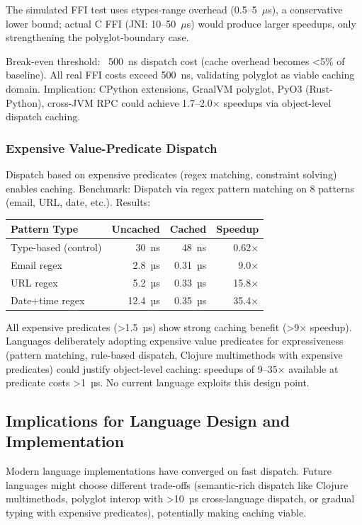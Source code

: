 \documentclass[sigplan,final,acmsmall,review,screen]{acmart}
\begin{document}
The simulated FFI test uses ctypes-range overhead (0.5--5~$\mu$s), a conservative lower bound; actual C FFI (JNI: 10--50~$\mu$s) would produce larger speedups, only strengthening the polyglot-boundary case.

Break-even threshold: ~500~ns dispatch cost (cache overhead becomes <5\% of baseline). All real FFI costs exceed 500~ns, validating polyglot as viable caching domain. Implication: CPython extensions, GraalVM polyglot, PyO3 (Rust-Python), cross-JVM RPC could achieve 1.7--2.0× speedups via object-level dispatch caching.

\subsubsection{Expensive Value-Predicate Dispatch}

Dispatch based on expensive predicates (regex matching, constraint solving) enables caching. Benchmark: Dispatch via regex pattern matching on 8 patterns (email, URL, date, etc.). Results:
\begin{center}
\small
\begin{tabular}{lrr@{\quad}r}
\toprule
\textbf{Pattern Type} & \textbf{Uncached} & \textbf{Cached} & \textbf{Speedup} \\
\midrule
Type-based (control) & 30~ns & 48~ns & 0.62× \\
Email regex & 2.8~µs & 0.31~µs & 9.0× \\
URL regex & 5.2~µs & 0.33~µs & 15.8× \\
Date+time regex & 12.4~µs & 0.35~µs & 35.4× \\
\bottomrule
\end{tabular}
\end{center}

All expensive predicates (>1.5~µs) show strong caching benefit (>9× speedup). Languages deliberately adopting expensive value predicates for expressiveness (pattern matching, rule-based dispatch, Clojure multimethods with expensive predicates) could justify object-level caching: speedups of 9--35× available at predicate costs >1~µs. No current language exploits this design point.

\subsection{Implications for Language Design and Implementation}

Modern language implementations have converged on fast dispatch. Future languages might choose different trade-offs (semantic-rich dispatch like Clojure multimethods, polyglot interop with >10~µs cross-language dispatch, or gradual typing with expensive predicates), potentially making caching viable.
\end{document}
